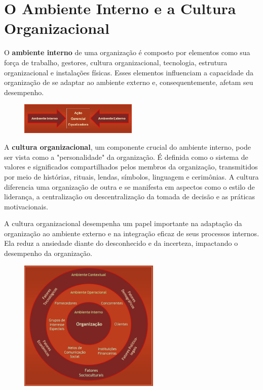 \section{O Ambiente Interno e a Cultura Organizacional}

O \textbf{ambiente interno} de uma organização é composto por elementos como sua força de trabalho, gestores, cultura organizacional, tecnologia, estrutura organizacional e instalações físicas. Esses elementos influenciam a capacidade da organização de se adaptar ao ambiente externo e, consequentemente, afetam seu desempenho.

\begin{figure}[!h]
    \centering
    \includegraphics[width=0.5\textwidth]{img/imagem2.png}
    \label{fig:exemplo}
\end{figure}


A \textbf{cultura organizacional}, um componente crucial do ambiente interno, pode ser vista como a "personalidade" da organização. É definida como o sistema de valores e significados compartilhados pelos membros da organização, transmitidos por meio de histórias, rituais, lendas, símbolos, linguagem e cerimônias. A cultura diferencia uma organização de outra e se manifesta em aspectos como o estilo de liderança, a centralização ou descentralização da tomada de decisão e as práticas motivacionais.

A cultura organizacional desempenha um papel importante na adaptação da organização ao ambiente externo e na integração eficaz de seus processos internos. Ela reduz a ansiedade diante do desconhecido e da incerteza, impactando o desempenho da organização.

\begin{figure}[!h]
    \centering
    \includegraphics[width=0.6\textwidth]{img/imagem1.png}
    \label{fig:exemplo}
\end{figure}

